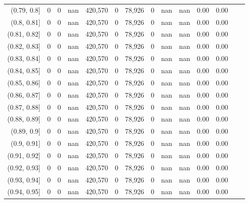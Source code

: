 \begin{tabular}{rrrrrrrrrrrrrr}
(0.79, 0.8]    &        0 &       0 &    nan &  420,570 &        0 &  78,926 &       0 &   nan &   nan &  0.00 &      0.00 \\
(0.8, 0.81]    &        0 &       0 &    nan &  420,570 &        0 &  78,926 &       0 &   nan &   nan &  0.00 &      0.00 \\
(0.81, 0.82]   &        0 &       0 &    nan &  420,570 &        0 &  78,926 &       0 &   nan &   nan &  0.00 &      0.00 \\
(0.82, 0.83]   &        0 &       0 &    nan &  420,570 &        0 &  78,926 &       0 &   nan &   nan &  0.00 &      0.00 \\
(0.83, 0.84]   &        0 &       0 &    nan &  420,570 &        0 &  78,926 &       0 &   nan &   nan &  0.00 &      0.00 \\
(0.84, 0.85]   &        0 &       0 &    nan &  420,570 &        0 &  78,926 &       0 &   nan &   nan &  0.00 &      0.00 \\
(0.85, 0.86]   &        0 &       0 &    nan &  420,570 &        0 &  78,926 &       0 &   nan &   nan &  0.00 &      0.00 \\
(0.86, 0.87]   &        0 &       0 &    nan &  420,570 &        0 &  78,926 &       0 &   nan &   nan &  0.00 &      0.00 \\
(0.87, 0.88]   &        0 &       0 &    nan &  420,570 &        0 &  78,926 &       0 &   nan &   nan &  0.00 &      0.00 \\
(0.88, 0.89]   &        0 &       0 &    nan &  420,570 &        0 &  78,926 &       0 &   nan &   nan &  0.00 &      0.00 \\
(0.89, 0.9]    &        0 &       0 &    nan &  420,570 &        0 &  78,926 &       0 &   nan &   nan &  0.00 &      0.00 \\
(0.9, 0.91]    &        0 &       0 &    nan &  420,570 &        0 &  78,926 &       0 &   nan &   nan &  0.00 &      0.00 \\
(0.91, 0.92]   &        0 &       0 &    nan &  420,570 &        0 &  78,926 &       0 &   nan &   nan &  0.00 &      0.00 \\
(0.92, 0.93]   &        0 &       0 &    nan &  420,570 &        0 &  78,926 &       0 &   nan &   nan &  0.00 &      0.00 \\
(0.93, 0.94]   &        0 &       0 &    nan &  420,570 &        0 &  78,926 &       0 &   nan &   nan &  0.00 &      0.00 \\
(0.94, 0.95]   &        0 &       0 &    nan &  420,570 &        0 &  78,926 &       0 &   nan &   nan &  0.00 &      0.00 \\

\end{tabular}
